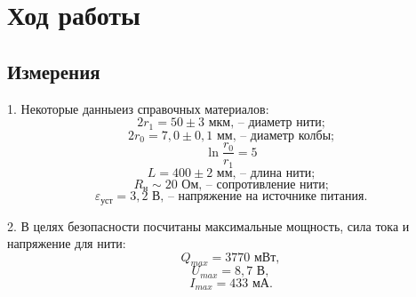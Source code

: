 \section{Ход работы}
\subsection{Измерения}

1. Некоторые данныеиз справочных материалов:
\[2r_1 = 50 \pm 3 \text{ мкм, -- диаметр нити;}\]
\[2r_0 = 7,0 \pm 0,1 \text{ мм, -- диаметр колбы;}\]
\[\ln \frac{r_0}{r_1} = 5\]
\[L = 400 \pm 2 \text{ мм, -- длина нити;}\]
\[R_\text{н} \sim  20 \text{ Ом, -- сопротивление нити;}\]
\[\varepsilon_\text{уст} = 3,2 \text{ В, -- напряжение на источнике питания.}\]

2. В целях безопасности посчитаны максимальные мощность, сила тока и напряжение для нити:
\[Q_{max} = 3770 \text{ мВт},\]
\[U_{max} = 8,7 \text{ В},\]
\[I_{max} = 433 \text{ мА}.\]

